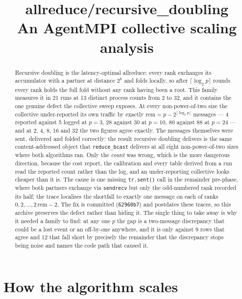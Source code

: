 \documentclass[11pt]{article}
\title{\textbf{allreduce/recursive\_doubling}\\[2pt]\large An AgentMPI collective scaling analysis}
\author{}
\date{}
\begin{document}
\maketitle

\begin{abstract}
Recursive doubling is the latency-optimal allreduce: every rank exchanges its accumulator with
a partner at distance $2^k$ and folds locally, so after $\lceil\log_2 p\rceil$ rounds every rank
holds the full fold without any rank having been a root. This family measures it in 21 runs at 13
distinct process counts from 2 to 32, and it contains the one genuine defect the collective sweep
exposes. At
every non-power-of-two size the collective under-reported its own traffic by exactly
$\mathrm{rem} = p - 2^{\lfloor\log_2 p\rfloor}$ messages --- 4 reported against 5 logged at
$p=3$, 28 against 30 at $p=10$, 80 against 88 at $p=24$ --- and at 2, 4, 8, 16 and 32 the two
figures agree exactly. The messages themselves were sent, delivered and folded correctly: the
result recursive doubling delivers is the same content-addressed object that
\texttt{reduce\_bcast} delivers at all eight non-power-of-two sizes where both algorithms ran.
Only the \emph{count} was wrong, which is the more dangerous direction, because the cost report,
the calibration and every table derived from a run read the reported count rather than the log,
and an under-reporting collective looks cheaper than it is. The cause is one missing
\texttt{tr.sent()} call in the remainder pre-phase, where both partners exchange via
\texttt{sendrecv} but only the odd-numbered rank recorded its half; the trace localises the
shortfall to exactly one message on each of ranks $0, 2, \ldots, 2\,\mathrm{rem}-2$. The fix is
committed (\texttt{62960b7}) and postdates these traces, so this archive preserves the defect
rather than hiding it. The single thing to take away is why it needed a family to find: at any
one $p$ the gap is a two-message discrepancy that could be a lost event or an off-by-one
anywhere, and it is only against 9 rows that agree and 12 that fall short by precisely the
remainder that the discrepancy stops being noise and names the code path that caused it.
\end{abstract}



\section{How the algorithm scales}
\end{document}
